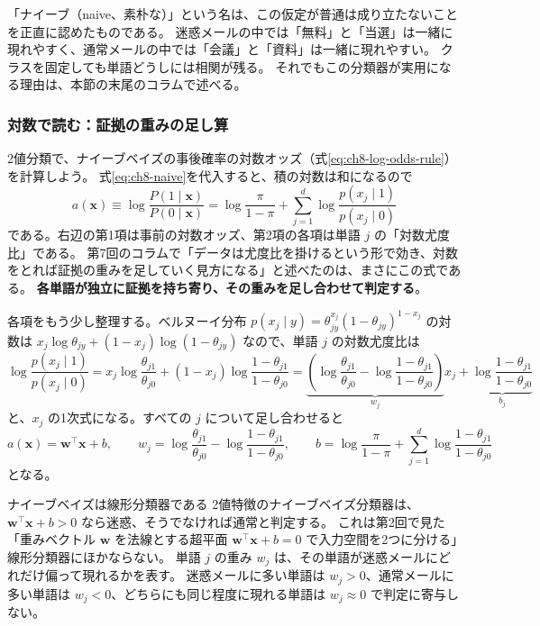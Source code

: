 「ナイーブ（naive、素朴な）」という名は、この仮定が普通は成り立たないことを正直に認めたものである。
迷惑メールの中では「無料」と「当選」は一緒に現れやすく、通常メールの中では「会議」と「資料」は一緒に現れやすい。
クラスを固定しても単語どうしには相関が残る。
それでもこの分類器が実用になる理由は、本節の末尾のコラムで述べる。

\subsubsection{対数で読む：証拠の重みの足し算}

2値分類で、ナイーブベイズの事後確率の対数オッズ（式\eqref{eq:ch8-log-odds-rule}）を計算しよう。
式\eqref{eq:ch8-naive}を代入すると、積の対数は和になるので
\begin{equation}
  a(\bm{x}) \equiv \log \frac{P(1 \mid \bm{x})}{P(0 \mid \bm{x})}
  = \log \frac{\pi}{1 - \pi} + \sum_{j=1}^d \log \frac{p(x_j \mid 1)}{p(x_j \mid 0)}
  \label{eq:ch8-nb-logodds}
\end{equation}
である。右辺の第1項は事前の対数オッズ、第2項の各項は単語 $j$ の「対数尤度比」である。
第7回のコラムで「データは尤度比を掛けるという形で効き、対数をとれば証拠の重みを足していく見方になる」と述べたのは、まさにこの式である。
\textbf{各単語が独立に証拠を持ち寄り、その重みを足し合わせて判定する}。

各項をもう少し整理する。ベルヌーイ分布 $p(x_j \mid y) = \theta_{jy}^{x_j}(1 - \theta_{jy})^{1 - x_j}$ の対数は
$x_j \log \theta_{jy} + (1 - x_j)\log(1 - \theta_{jy})$ なので、単語 $j$ の対数尤度比は
\begin{equation*}
  \log \frac{p(x_j \mid 1)}{p(x_j \mid 0)}
  = x_j \log \frac{\theta_{j1}}{\theta_{j0}} + (1 - x_j) \log \frac{1 - \theta_{j1}}{1 - \theta_{j0}}
  = \underbrace{\left( \log \frac{\theta_{j1}}{\theta_{j0}} - \log \frac{1 - \theta_{j1}}{1 - \theta_{j0}} \right)}_{w_j} x_j
    + \underbrace{\log \frac{1 - \theta_{j1}}{1 - \theta_{j0}}}_{b_j}
\end{equation*}
と、$x_j$ の1次式になる。すべての $j$ について足し合わせると
\begin{equation}
  a(\bm{x}) = \bm{w}^\top\bm{x} + b,
  \qquad
  w_j = \log \frac{\theta_{j1}}{\theta_{j0}} - \log \frac{1 - \theta_{j1}}{1 - \theta_{j0}},
  \qquad
  b = \log \frac{\pi}{1 - \pi} + \sum_{j=1}^d \log \frac{1 - \theta_{j1}}{1 - \theta_{j0}}
  \label{eq:ch8-nb-linear}
\end{equation}
となる。

\begin{itembox}[l]{ナイーブベイズは線形分類器である}
2値特徴のナイーブベイズ分類器は、$\bm{w}^\top\bm{x} + b > 0$ なら迷惑、そうでなければ通常と判定する。
これは第2回で見た「重みベクトル $\bm{w}$ を法線とする超平面 $\bm{w}^\top\bm{x} + b = 0$ で入力空間を2つに分ける」線形分類器にほかならない。
単語 $j$ の重み $w_j$ は、その単語が迷惑メールにどれだけ偏って現れるかを表す。
迷惑メールに多い単語は $w_j > 0$、通常メールに多い単語は $w_j < 0$、どちらにも同じ程度に現れる単語は $w_j \approx 0$ で判定に寄与しない。
\end{itembox}

